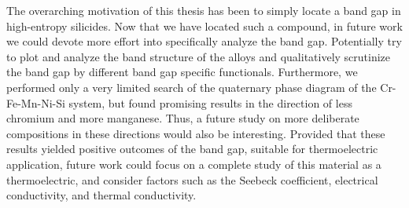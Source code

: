 \documentclass[UKenglish]{ifimaster}  %
\begin{document}
The overarching motivation of this thesis has been to simply locate a band gap in high-entropy silicides. Now that we have located such a compound, in future work we could devote more effort into specifically analyze the band gap. Potentially try to plot and analyze the band structure of the alloys and qualitatively scrutinize the band gap by different band gap specific functionals. Furthermore, we performed only a very limited search of the quaternary phase diagram of the Cr-Fe-Mn-Ni-Si system, but found promising results in the direction of less chromium and more manganese. Thus, a future study on more deliberate compositions in these directions would also be interesting. Provided that these results yielded positive outcomes of the band gap, suitable for thermoelectric application, future work could focus on a complete study of this material as a thermoelectric, and consider factors such as the Seebeck coefficient, electrical conductivity, and thermal conductivity. 

\appendix


\backmatter{}
\printbibliography
\end{document}
